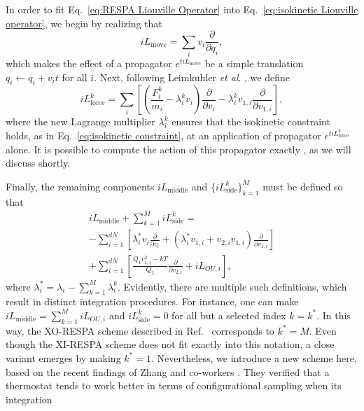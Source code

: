 \documentclass[
    journal=jctcce,
    layout=twocolumn
]{achemso}
\newcommand{\diff}[2]{\frac{\partial #2}{\partial #1}} %
\newcommand{\dof}{i}   %
\begin{document}
In order to fit Eq.~\eqref{eq:RESPA Liouville Operator} into Eq.~\eqref{eq:isokinetic Liouville operator}, we begin by realizing that
\begin{equation}
iL_\mathrm{move} = \sum_\dof v_\dof \diff{q_\dof}{},
\end{equation}
which makes the effect of a propagator $e^{t iL_\mathrm{move}}$ be a simple translation $q_\dof \leftarrow q_\dof + v_\dof t$ for all $\dof$.
Next, following Leimkuhler \textit{et al}. \cite{Leimkuhler_2013}, we define
\begin{equation}
\label{eq:force-dependent Liouville operator}
iL_\mathrm{force}^k = \sum_\dof \left[\left(\frac{F^k_\dof}{m_\dof} - \lambda^k_\dof v_\dof \right)\diff{v_\dof}{} - \lambda^k_\dof v_{1,\dof} \diff{v_{1,\dof}}{}\right],
\end{equation}
where the new Lagrange multiplier $\lambda^k_\dof$ ensures that the isokinetic constraint holds, as in Eq.~\eqref{eq:isokinetic constraint}, at an application of propagator $e^{t iL_\mathrm{force}^k}$ alone.
It is possible to compute the action of this propagator exactly \cite{Minary_2003, Leimkuhler_2013}, as we will discuss shortly.

Finally, the remaining components $iL_\mathrm{middle}$ and $\{iL_\mathrm{side}^k\}_{k=1}^M$ must be defined so that
\begin{multline}
iL_\mathrm{middle} + \sum_{k=1}^M iL_\mathrm{side}^k = \\
- \sum_{\dof=1}^{dN} \left[ \lambda^\ast_\dof v_\dof\diff{v_\dof}{} + \left(\lambda^\ast_\dof v_{1,\dof} + v_{2,\dof} v_{1,\dof}\right)\diff{v_{1,\dof}}{} \right] \\
+ \sum_{\dof=1}^{dN} \left[\tfrac{Q_1 v_{1,\dof}^2 - kT}{Q_2}\diff{v_{2,\dof}}{}
+ iL_{OU,\dof} \right],
\end{multline}
where $\lambda^\ast_\dof = \lambda_\dof - \sum_{k=1}^M \lambda^k_\dof$.
Evidently, there are multiple such definitions, which result in distinct integration procedures.
For instance, one can make $iL_\mathrm{middle} = \sum_{k=1}^M iL_{OU,\dof}$ and $iL_\mathrm{side}^k = 0$ for all but a selected index $k = k^\ast$.
In this way, the XO-RESPA scheme described in Ref.~ corresponds to $k^\ast = M$.
Even though the XI-RESPA scheme \cite{Leimkuhler_2013} does not fit exactly into this notation, a close variant emerges by making $k^\ast = 1$.
Nevertheless, we introduce a new scheme here, based on the recent findings of Zhang and co-workers \cite{Zhang_2017}.
They verified that a thermostat tends to work better in terms of configurational sampling when its integration 
\end{document}
